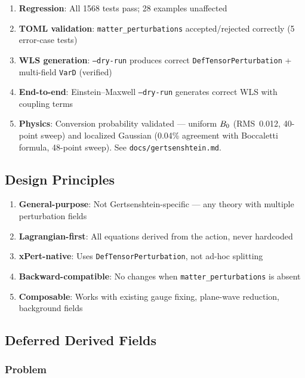 \begin{enumerate}
  \item \textbf{Regression}: All 1568 tests pass; 28 examples unaffected
  \item \textbf{TOML validation}: \texttt{matter\_perturbations} accepted/rejected correctly (5 error-case tests)
  \item \textbf{WLS generation}: \texttt{--dry-run} produces correct \texttt{DefTensorPerturbation} + multi-field \texttt{VarD} (verified)
  \item \textbf{End-to-end}: Einstein--Maxwell \texttt{--dry-run} generates correct WLS with coupling terms
  \item \textbf{Physics}: Conversion probability validated --- uniform $B_0$ (RMS~0.012, 40-point sweep) and localized Gaussian (0.04\% agreement with Boccaletti formula, 48-point sweep). See \texttt{docs/gertsenshtein.md}.
\end{enumerate}

\subsection{Design Principles}
\label{sec:mfp-design}

\begin{enumerate}
  \item \textbf{General-purpose}: Not Gertsenshtein-specific --- any theory with multiple perturbation fields
  \item \textbf{Lagrangian-first}: All equations derived from the action, never hardcoded
  \item \textbf{xPert-native}: Uses \texttt{DefTensorPerturbation}, not ad-hoc splitting
  \item \textbf{Backward-compatible}: No changes when \texttt{matter\_perturbations} is absent
  \item \textbf{Composable}: Works with existing gauge fixing, plane-wave reduction, background fields
\end{enumerate}

\subsection{Deferred Derived Fields}
\label{sec:mfp-deferred}

\subsubsection{Problem}

